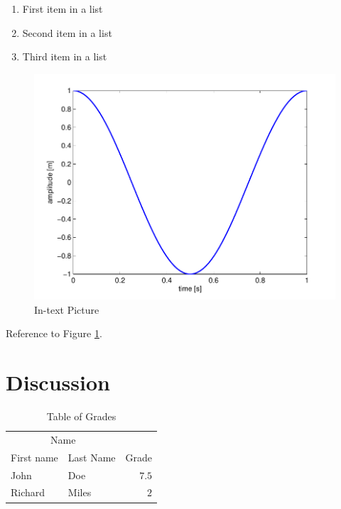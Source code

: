 \documentclass[fleqn,10pt]{SelfArx}\usepackage[]{graphicx}\usepackage[]{color}
\begin{document}
\lipsum[1] %

\begin{enumerate}[noitemsep] %
\item First item in a list
\item Second item in a list
\item Third item in a list
\end{enumerate}

\begin{figure}[ht]\centering
\includegraphics[width=\linewidth]{results}
\caption{In-text Picture}
\label{fig:results}
\end{figure}

Reference to Figure \ref{fig:results}.


\section{Discussion}

\lipsum[1] %

\lipsum[1] %

\begin{table}[hbt]
\caption{Table of Grades}
\centering
\begin{tabular}{llr}
\toprule
\multicolumn{2}{c}{Name} \\
\cmidrule(r){1-2}
First name & Last Name & Grade \\
\midrule
John & Doe & $7.5$ \\
Richard & Miles & $2$ \\
\bottomrule
\end{tabular}
\label{tab:label}
\end{table}
\end{document}
